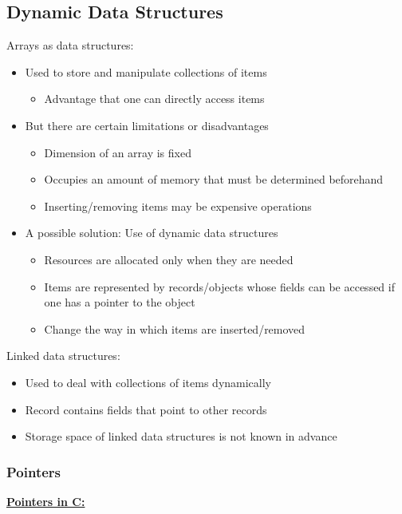 \subsection{Dynamic Data Structures}
Arrays as data structures:
\begin{itemize}
    \item Used to store and manipulate collections of items
    \begin{itemize}
        \item Advantage that one can directly access items
    \end{itemize}
    \item But there are certain limitations or disadvantages
    \begin{itemize}
        \item Dimension of an array is fixed 
        \item Occupies an amount of memory that must be determined beforehand
        \item Inserting/removing items may be expensive operations
    \end{itemize}
    \item A possible solution: Use of dynamic data structures
    \begin{itemize}
        \item Resources are allocated only when they are needed
        \item Items are represented by records/objects whose fields can be accessed if one has a pointer to the object
        \item Change the way in which items are inserted/removed
    \end{itemize}
\end{itemize}

Linked data structures:
\begin{itemize}
    \item Used to deal with collections of items dynamically
    \item Record contains fields that point to other records
    \item Storage space of linked data structures is not known in advance
\end{itemize}

\subsubsection{Pointers}

\textbf{\underline{Pointers in C:}}\\

